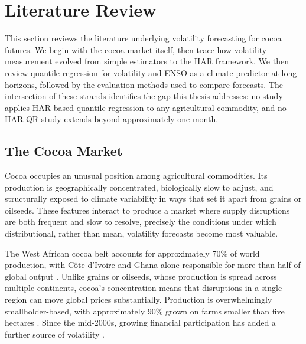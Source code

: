 \section{Literature Review}
\label{sec:literature}

This section reviews the literature underlying volatility forecasting for
cocoa futures. We begin with the cocoa market itself, then trace how
volatility measurement evolved from simple estimators to the HAR framework.
We then review quantile regression for volatility and ENSO as a climate
predictor at long horizons, followed by the evaluation methods used to
compare forecasts. The intersection of these strands identifies the gap
this thesis addresses: no study applies HAR-based quantile regression to
any agricultural commodity, and no HAR-QR study extends beyond
approximately one month.

\subsection{The Cocoa Market}
\label{sec:lit-cocoa}

Cocoa occupies an unusual position among agricultural commodities. Its
production is geographically concentrated, biologically slow to adjust, and
structurally exposed to climate variability in ways that set it apart from
grains or oilseeds. These features interact to produce a market where supply
disruptions are both frequent and slow to resolve, precisely the conditions
under which distributional, rather than mean, volatility forecasts become
most valuable.

The West African cocoa belt accounts for approximately 70\% of world
production, with Côte d'Ivoire and Ghana alone responsible for more than
half of global output
\parencite{schrothVulnerabilityClimateChange2016,
laderachPredictingFutureClimatic2013}. Unlike grains or oilseeds, whose
production is spread across multiple continents, cocoa's concentration
means that disruptions in a single region can move global prices
substantially. Production is overwhelmingly smallholder-based, with
approximately 90\% grown on farms smaller than five hectares
\parencite{benschFinalReportFederal}. Since the
mid-2000s, growing financial participation has added a further source of
volatility \parencite{benschFinalReportFederal, gilbertFoodPriceVolatility2010, rognaAnalysisCocoaMarket2025}.

